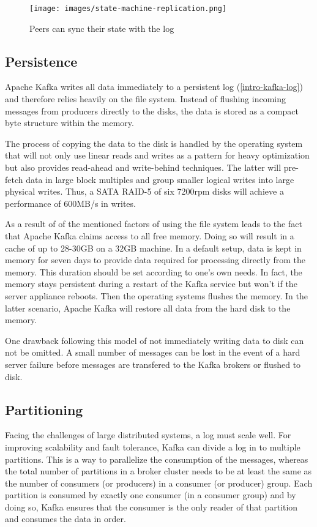\begin{figure}[H]
    \centering
    \texttt{[image: images/state-machine-replication.png]}
    \caption{Peers can sync their state with the log \cite{JK-TheLog}}
    \label{fig:the-log}
\end{figure}

\subsection{Persistence}
\label{kafka-persistence}
Apache Kafka writes all data immediately to a persistent log
(\ref{intro-kafka-log}) 
and therefore relies heavily on the file system.
Instead of flushing incoming messages from producers directly to the disks, the
data is stored as a compact byte structure within the memory.

The process of copying the data to the disk is handled by the operating system
that will not only use linear reads and writes as a pattern for heavy
optimization but also provides read-ahead and write-behind techniques.
The latter will pre-fetch data in large block multiples and group smaller logical
writes into large physical writes. Thus, a SATA RAID-5 of six 7200rpm
disks will achieve a performance of 600MB/s in writes.

As a result of of the mentioned factors of using the file system leads to the
fact that Apache Kafka claims access to all free memory. Doing so will result in
a cache of up to 28-30GB on a 32GB machine. In a default setup, data is kept in
memory for seven days to provide data required for processing directly from the
memory. This duration should be set according to one's own needs. In fact, the
memory stays persistent during a restart of the Kafka service but won't if the
server appliance reboots. Then the operating systems flushes the memory. In the
latter scenario, Apache Kafka will restore all data from the hard disk to the
memory. \cite{apachekafka}

One drawback following this model of not immediately writing data to disk can not be
omitted. A small number of messages can be lost in the event of a hard server
failure before messages are transfered to the Kafka brokers or flushed to disk.
\cite{goodhope2012building}

\subsection{Partitioning}
\label{kafka-partitioning}
Facing the challenges of large distributed systems, a log must scale well. For
improving scalability and fault tolerance, Kafka can divide a log in to multiple
partitions. This is a way to parallelize the consumption of the messages, whereas
the total number of partitions in a broker cluster needs to be at least the same
as the number of consumers (or producers) in a consumer (or producer) group.
Each partition is consumed by exactly one consumer (in a consumer group) and by
doing so, Kafka ensures that the consumer is the only reader of that partition
and consumes the data in order.

